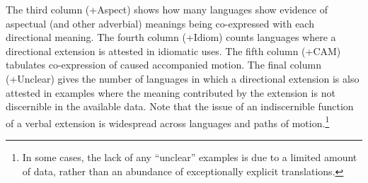 The third column (+Aspect) shows how many languages show evidence of aspectual (and other adverbial) meanings being co-expressed with each directional meaning. The fourth column (+Idiom) counts languages where a directional extension is attested in idiomatic uses. The fifth column (+CAM) tabulates co-expression of caused accompanied motion. The final column (+Unclear) gives the number of languages in which a directional extension is also attested in examples where the meaning contributed by the extension is not discernible in the available data. Note that the issue of an indiscernible function of a verbal extension is widespread across languages and paths of motion.\footnote{In some cases, the lack of any ``unclear'' examples is due to a limited amount of data, rather than an abundance of exceptionally explicit translations.} 

